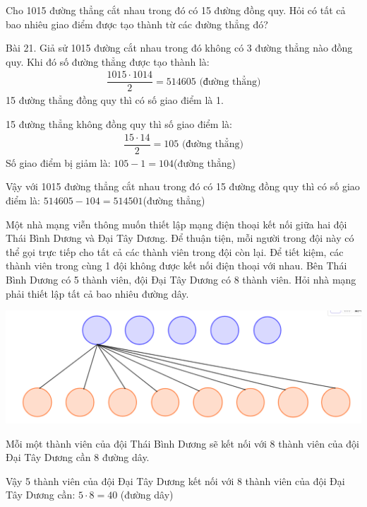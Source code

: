 \begin{bt}
	Cho 1015 đường thẳng cắt nhau trong đó có 15 đường đồng quy. Hỏi có tất cả bao nhiêu giao điểm được tạo thành từ các đường thẳng đó?
	\begin{loigiaichuong28}
		Bài 21. Giả sử 1015 đường cắt nhau trong đó không có 3 đường thẳng nào đồng quy. Khi đó số đường thẳng được tạo thành là:
		\begin{align*}
			\dfrac{1015\cdot1014}{2}=514605 \text{ (đường thẳng)}
		\end{align*}
		15 đường thẳng đồng quy thì có số giao điểm là 1.
		
		15 đường thẳng không đồng quy thì số giao điểm là: 
		\begin{align*}
			\dfrac{15\cdot14}{2}=105 \text{ (đường thẳng)}
		\end{align*}
		Số giao điểm bị giảm là: $105-1=104$(đường thẳng)
		
		Vậy với 1015 đường thẳng cắt nhau trong đó có 15 đường đồng quy thì có số giao điểm là: $514605-104=514501$(đường thẳng)
	\end{loigiaichuong28}
\end{bt}
\begin{bt}
	Một nhà mạng viễn thông muốn thiết lập mạng điện thoại kết nối giữa hai đội Thái Bình Dương và Đại Tây Dương. Để thuận tiện, mỗi người trong đội này có thể gọi trực tiếp cho tất cả các thành viên trong đội còn lại. Để tiết kiệm, các thành viên trong cùng 1 đội không được kết nối điện thoại với nhau. Bên Thái Bình Dương có 5 thành viên, đội Đại Tây Dương có 8 thành viên. Hỏi nhà mạng phải thiết lập tất cả bao nhiêu đường dây.
	\begin{center}
		\includegraphics[width=0.7\linewidth]{image042}
	\end{center}
	\begin{loigiaichuong28}
		Mỗi một thành viên của đội Thái Bình Dương sẽ kết nối với 8 thành viên của đội Đại Tây Dương cần 8 đường dây.
		
		Vậy 5 thành viên của đội Đại Tây Dương kết nối với 8 thành viên của đội Đại Tây Dương cần: $5\cdot8=40$ (đường dây)
	\end{loigiaichuong28}
\end{bt}

